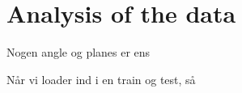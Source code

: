 \chapter{Analysis of the data}



Nogen angle og planes er ens

Når vi loader ind i en train og test, så 